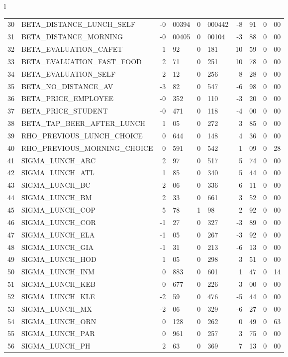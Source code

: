 \begin{tabular}{l}
\begin{tabular}{rlr@{.}lr@{.}lr@{.}lr@{.}l}
30 & BETA_DISTANCE_LUNCH_SELF & -0&00394 & 0&000442 & -8&91 & 0&00\\
31 & BETA_DISTANCE_MORNING & -0&00405 & 0&00104 & -3&88 & 0&00\\
32 & BETA_EVALUATION_CAFET & 1&92 & 0&181 & 10&59 & 0&00\\
33 & BETA_EVALUATION_FAST_FOOD & 2&71 & 0&251 & 10&78 & 0&00\\
34 & BETA_EVALUATION_SELF & 2&12 & 0&256 & 8&28 & 0&00\\
35 & BETA_NO_DISTANCE_AV & -3&82 & 0&547 & -6&98 & 0&00\\
36 & BETA_PRICE_EMPLOYEE & -0&352 & 0&110 & -3&20 & 0&00\\
37 & BETA_PRICE_STUDENT & -0&471 & 0&118 & -4&00 & 0&00\\
38 & BETA_TAP_BEER_AFTER_LUNCH & 1&05 & 0&272 & 3&85 & 0&00\\
39 & RHO_PREVIOUS_LUNCH_CHOICE & 0&644 & 0&148 & 4&36 & 0&00\\
40 & RHO_PREVIOUS_MORNING_CHOICE & 0&591 & 0&542 & 1&09 & 0&28\\
41 & SIGMA_LUNCH_ARC & 2&97 & 0&517 & 5&74 & 0&00\\
42 & SIGMA_LUNCH_ATL  & 1&85 & 0&340 & 5&44 & 0&00\\
43 & SIGMA_LUNCH_BC & 2&06 & 0&336 & 6&11 & 0&00\\
44 & SIGMA_LUNCH_BM & 2&33 & 0&661 & 3&52 & 0&00\\
45 & SIGMA_LUNCH_COP & 5&78 & 1&98 & 2&92 & 0&00\\
46 & SIGMA_LUNCH_COR  & -1&27 & 0&327 & -3&89 & 0&00\\
47 & SIGMA_LUNCH_ELA & -1&05 & 0&267 & -3&92 & 0&00\\
48 & SIGMA_LUNCH_GIA  & -1&31 & 0&213 & -6&13 & 0&00\\
49 & SIGMA_LUNCH_HOD  & 1&05 & 0&298 & 3&51 & 0&00\\
50 & SIGMA_LUNCH_INM  & 0&883 & 0&601 & 1&47 & 0&14\\
51 & SIGMA_LUNCH_KEB  & 0&677 & 0&226 & 3&00 & 0&00\\
52 & SIGMA_LUNCH_KLE & -2&59 & 0&476 & -5&44 & 0&00\\
53 & SIGMA_LUNCH_MX  & -2&06 & 0&329 & -6&27 & 0&00\\
54 & SIGMA_LUNCH_ORN  & 0&128 & 0&262 & 0&49 & 0&63\\
55 & SIGMA_LUNCH_PAR  & 0&961 & 0&257 & 3&75 & 0&00\\
56 & SIGMA_LUNCH_PH  & 2&63 & 0&369 & 7&13 & 0&00\\

\end{tabular}
\end{tabular}
